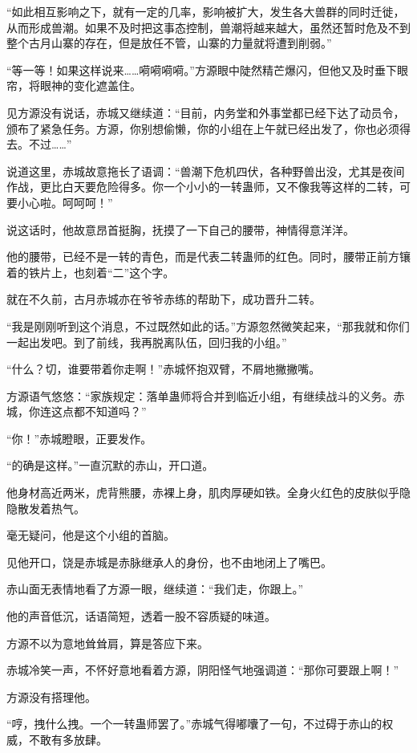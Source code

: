 \begin{this_body}
“如此相互影响之下，就有一定的几率，影响被扩大，发生各大兽群的同时迁徙，从而形成兽潮。如果不及时把这事态控制，兽潮将越来越大，虽然还暂时危及不到整个古月山寨的存在，但是放任不管，山寨的力量就将遭到削弱。”

“等一等！如果这样说来……嗬嗬嗬嗬。”方源眼中陡然精芒爆闪，但他又及时垂下眼帘，将眼神的变化遮盖住。

见方源没有说话，赤城又继续道：“目前，内务堂和外事堂都已经下达了动员令，颁布了紧急任务。方源，你别想偷懒，你的小组在上午就已经出发了，你也必须得去。不过……”

说道这里，赤城故意拖长了语调：“兽潮下危机四伏，各种野兽出没，尤其是夜间作战，更比白天要危险得多。你一个小小的一转蛊师，又不像我等这样的二转，可要小心啦。呵呵呵！”

说这话时，他故意昂首挺胸，抚摸了一下自己的腰带，神情得意洋洋。

他的腰带，已经不是一转的青色，而是代表二转蛊师的红色。同时，腰带正前方镶着的铁片上，也刻着“二”这个字。

就在不久前，古月赤城亦在爷爷赤练的帮助下，成功晋升二转。

“我是刚刚听到这个消息，不过既然如此的话。”方源忽然微笑起来，“那我就和你们一起出发吧。到了前线，我再脱离队伍，回归我的小组。”

“什么？切，谁要带着你走啊！”赤城怀抱双臂，不屑地撇撇嘴。

方源语气悠悠：“家族规定：落单蛊师将合并到临近小组，有继续战斗的义务。赤城，你连这点都不知道吗？”

“你！”赤城瞪眼，正要发作。

“的确是这样。”一直沉默的赤山，开口道。

他身材高近两米，虎背熊腰，赤裸上身，肌肉厚硬如铁。全身火红色的皮肤似乎隐隐散发着热气。

毫无疑问，他是这个小组的首脑。

见他开口，饶是赤城是赤脉继承人的身份，也不由地闭上了嘴巴。

赤山面无表情地看了方源一眼，继续道：“我们走，你跟上。”

他的声音低沉，话语简短，透着一股不容质疑的味道。

方源不以为意地耸耸肩，算是答应下来。

赤城冷笑一声，不怀好意地看着方源，阴阳怪气地强调道：“那你可要跟上啊！”

方源没有搭理他。

“哼，拽什么拽。一个一转蛊师罢了。”赤城气得嘟囔了一句，不过碍于赤山的权威，不敢有多放肆。


\end{this_body}
